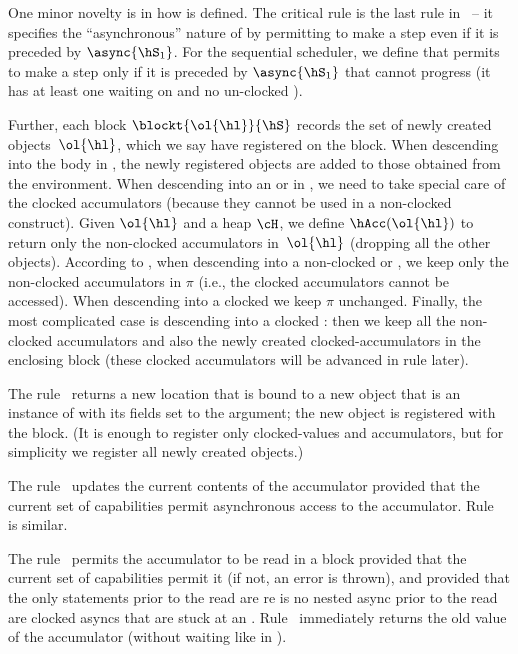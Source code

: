 One minor novelty is in how \hasync{} is
defined. The critical rule is the last rule in~ -- it
specifies the ``asynchronous'' nature of \hasync{} by permitting \hS{}
to make a step even if it is preceded by $\async{\hS_1}$.
For the sequential scheduler, we define 
    that permits \hS{}
to make a step only if it is preceded by $\async{\hS_1}$ that cannot progress
    (it has at least one  waiting on \xadvance and no un-clocked \async).

Further,
each block $\blockt{\ol{\hl}}{\hS}$ records the set of newly created objects~$\ol{\hl}$, which we say have registered on the block.
When descending into the body in , the newly registered objects are added to
    those obtained from the environment.
When descending into an \async or \finish in , we need to take special care of the clocked
    accumulators (because they cannot be used in a non-clocked construct).
Given $\ol{\hl}$ and a heap $\cH$,
    we define
    $\hAcc(\ol{\hl})$ to return only the non-clocked accumulators in~$\ol{\hl}$
    (dropping all the other objects).
According to , when descending into a non-clocked
    \async or \finish, we keep only the non-clocked accumulators in $\pi$
    (i.e., the clocked accumulators cannot be accessed).
When descending into a clocked \async we keep $\pi$ unchanged.
Finally, the most complicated case is descending into a clocked \finish:
    then we keep all the non-clocked accumulators and also the newly created clocked-accumulators in the enclosing block
    (these clocked accumulators will be advanced in rule  later).

The rule~ returns a new location that is bound to a new
    object that is an instance of \hC{} with its fields set to the argument;
    the new object is registered with the block.
(It is enough to register only clocked-values and accumulators, but
    for simplicity we register all newly created objects.)




The rule~ updates the current contents of the
accumulator provided that the current set of capabilities permit
asynchronous access to the accumulator.
Rule~ is similar.

The rule~ permits the accumulator to be read in a
block provided that the current set of capabilities permit it (if not,
an error is thrown), and provided that the only statements prior to
the read are re is no nested async prior to the read are clocked
asyncs that are stuck at an \hadvance.
Rule~ immediately returns the old value of the accumulator (without waiting like in ).

